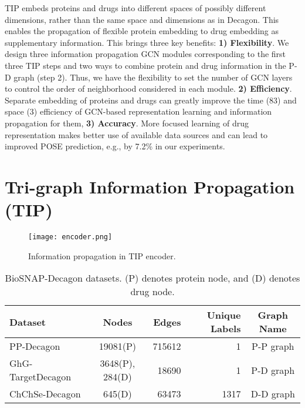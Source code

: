 \documentclass{article}
\begin{document}
TIP embeds proteins and drugs into different spaces of possibly different dimensions, rather than the same space and dimensions as in Decagon. This enables the propagation of flexible protein embedding to drug embedding as supplementary information. 
This brings three key benefits: \textbf{1) Flexibility}. We design three information propagation GCN modules corresponding to the first three TIP steps and two ways to combine protein and drug information in the P-D graph (step 2). Thus, we have the flexibility to set the number of GCN layers to control the order of neighborhood considered in each module.
\textbf{2) Efficiency}. Separate embedding of proteins and drugs can greatly improve the time (83) and space (3) efficiency of GCN-based representation learning and information propagation for them,  
\textbf{3) Accuracy}. More focused learning of drug representation makes better use of available data sources and can lead to improved POSE prediction, e.g., by 7.2\% in our experiments. 





\par






















\section{Tri-graph Information Propagation (TIP)}
\label{model}




\begin{figure}[t]
	\centering
	\texttt{[image: encoder.png]}
	\caption{Information propagation in TIP encoder.}
	\vspace{-4mm}
	\label{fig:encoder}
\end{figure}


\begin{table}[t]
  \caption{BioSNAP-Decagon \cite{snap} datasets. (P) denotes protein node, and (D) denotes drug node.}
  \label{tab:dataset}
  \centering
  \begin{tabular}{l c r r c}
    \toprule
    \textbf{Dataset}     & \textbf{Nodes}     & \textbf{Edges} & \textbf{Unique Labels} & \textbf{Graph Name}\\
    \midrule
    PP-Decagon & 19081(P) & 715612 & 1 & P-P graph\\
    GhG-TargetDecagon & 3648(P), 284(D) & 18690 & 1 & P-D graph\\
    ChChSe-Decagon & 645(D) & 63473 & 1317 & D-D graph\\
    \bottomrule
  \end{tabular}
  \vspace{-5mm}
\end{table}
\end{document}
